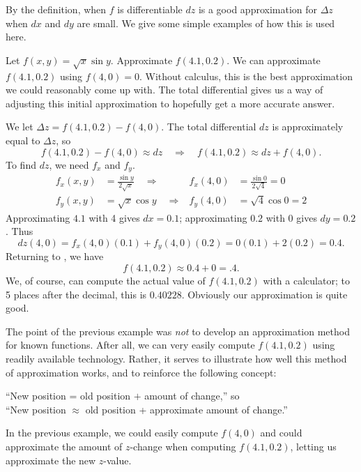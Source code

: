 By the definition, when $f$ is differentiable $dz$ is a good approximation for $\Delta z$ when $dx$ and $dy$ are small. We give some simple examples of how this is used here.

\begin{example}\label{ex_totaldiff2}
Let $f(x,y)=\sqrt{x}\sin y$. Approximate $f(4.1,0.2)$.
\solution
We can approximate $f(4.1,0.2)$ using $f(4,0)=0$. Without calculus, this is the best approximation we could reasonably come up with. The total differential gives us a way of adjusting this initial approximation to hopefully get a more accurate answer.

We let $\Delta z = f(4.1,0.2) - f(4,0)$. The total differential $dz$ is approximately equal to $\Delta z$, so
\begin{equation}
f(4.1,0.2) - f(4,0) \approx dz
\quad \Rightarrow \quad
f(4.1,0.2) \approx dz + f(4,0).\label{eq:totaldiff2}
\end{equation}
To find $dz$, we need $f_x$ and $f_y$.
\begin{align*}
f_x(x,y) &= \frac{\sin y}{2\sqrt{x}} \quad\Rightarrow&
f_x(4,0) &= \frac{\sin0}{2\sqrt{4}}=0 \\
f_y(x,y) &= \sqrt{x}\cos y \quad\Rightarrow&
f_y(4,0) &= \sqrt{4}\cos0=2
\end{align*}
Approximating $4.1$ with 4 gives $dx = 0.1$; approximating $0.2$ with $0$ gives $dy=0.2$. Thus
\[
dz(4,0) = f_x(4,0)(0.1) + f_y(4,0)(0.2)
=0(0.1) + 2(0.2)
=0.4.
\]
Returning to , we have
\[f(4.1,0.2) \approx 0.4 + 0 = .4.\]
We, of course, can compute the actual value of $f(4.1,0.2)$ with a calculator; to 5 places after the decimal, this is $0.40228$. Obviously our approximation is quite good.
\end{example}

The point of the previous example was \textit{not} to develop an approximation method for known functions. After all, we can very easily compute $f(4.1,0.2)$ using readily available technology. Rather, it serves to illustrate how well this method of approximation works, and to reinforce the following concept:
\begin{center}
	``New position = old position $+$ amount of change,'' so\\
	``New position $\approx$ old position + approximate amount of change.''
\end{center}

In the previous example, we could easily compute $f(4,0)$ and could approximate the amount of $z$-change when computing $f(4.1,0.2)$, letting us approximate the new $z$-value.

